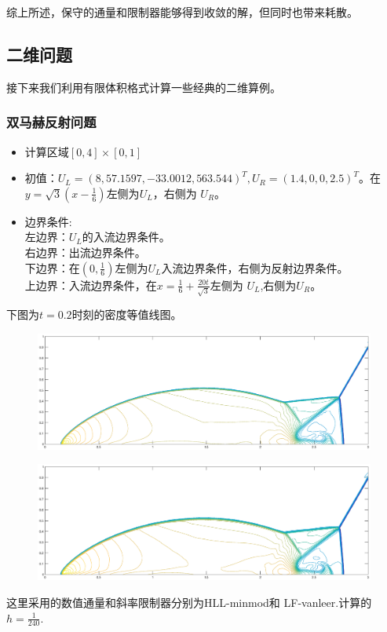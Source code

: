 \documentclass[a4paper,  11pt]{ctexart}
\begin{document}
综上所述，保守的通量和限制器能够得到收敛的解，但同时也带来耗散。
\subsection{二维问题}
接下来我们利用有限体积格式计算一些经典的二维算例。
\subsubsection{双马赫反射问题}
\begin{itemize}
  \item 计算区域$[0,4]\times[0,1]$
  \item 初值：$U_L=(8,57.1597,-33.0012,563.544)^T,U_R=
    (1.4,0,0,2.5)^T$。在$y=\sqrt{3}(x-\frac 16)$左侧为$U_L$，右侧为
    $U_R$。
  \item 边界条件:\\
    左边界：$U_L$的入流边界条件。 \\
    右边界：出流边界条件。 \\
    下边界：在$(0,\frac 16)$左侧为$U_L$入流边界条件，右侧为反射边界条件。\\
    上边界：入流边界条件，在$x=\frac 16+\frac{20t}{\sqrt{3}}$左侧为
    $U_L$,右侧为$U_R$。
\end{itemize}
下图为$t=0.2$时刻的密度等值线图。
\begin{figure}[H]
  \begin{center}
    \includegraphics[width=\textwidth]{./images/MachReflection-960-240-HLL-minmod.eps}
  \end{center}
\end{figure}
\vspace{-3cm}
\begin{figure}[H]
  \begin{center}
    \includegraphics[width=\textwidth]{./images/MachReflection-960-240-LF-vanLeer.eps}
  \end{center}
\end{figure}
这里采用的数值通量和斜率限制器分别为HLL-minmod和
LF-vanleer.计算的$h=\frac{1}{240}$.
\end{document}
